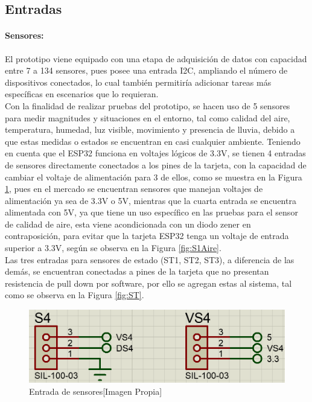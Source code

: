 	\subsection{Entradas}
	\paragraph{Sensores:}
		El prototipo viene equipado con una etapa de adquisición de datos con capacidad entre 7 a 134 sensores, pues posee una entrada I2C, ampliando el número de dispositivos conectados, lo cual también permitiría adicionar tareas más específicas en escenarios que lo requieran.\\
		
		Con la finalidad de realizar pruebas del prototipo, se hacen uso de 5 sensores para medir magnitudes y situaciones en el entorno, tal como calidad del aire, temperatura, humedad, luz visible, movimiento y presencia de lluvia, debido a que estas medidas o estados se encuentran en casi cualquier ambiente. Teniendo en cuenta que el ESP32 funciona en voltajes lógicos de 3.3V, se tienen 4 entradas de sensores directamente conectados a los pines de la tarjeta, con la capacidad de cambiar el voltaje de alimentación para 3 de ellos, como se muestra en la Figura \ref{fig:SVS}, pues en el mercado se encuentran sensores que manejan voltajes de alimentación ya sea de 3.3V o 5V, mientras que la cuarta entrada se encuentra alimentada con 5V, ya que tiene un uso específico en las pruebas para el sensor de calidad de aire, esta viene acondicionada con un diodo zener en contraposición, para evitar que la tarjeta ESP32 tenga un voltaje de entrada superior a 3.3V, según se observa en la Figura \ref{fig:S1Aire}.\\
		
		Las tres entradas para sensores de estado (ST1, ST2, ST3), a diferencia de las demás, se encuentran conectadas a pines de la tarjeta que no presentan resistencia de pull down por software, por ello se agregan estas al sistema, tal como se observa en la Figura \ref{fig:ST}.\\
		
		\begin{figure}[H]
			\centering
			\caption{Entrada de sensores[Imagen Propia]}
			\label{fig:SVS}
			\includegraphics[width=0.7\linewidth]{Imagenes/SVS}
		\end{figure}
	
